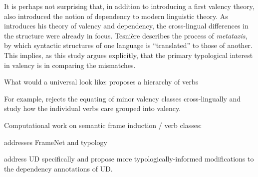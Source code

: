 It is perhaps not surprising that, in addition to introducing a first valency theory, \citet{tesniere1959} also introduced the notion of dependency to modern linguistic theory. 
As \citet{tesniere1959} introduces his theory of valency and dependency, the cross-lingual differences in the structure were already in focus. Tesnière describes the process of \textit{metataxis}, by which syntactic structures of one language is ``translated'' to those of another. This implies, as this study argues explicitly, that the primary typological interest in valency is in comparing the mismatches. 

What would a universal look like: \citet{tsunoda1981, tsunoda1985, tsunoda2015} proposes a hierarchy of verbs









For example, \citet{say2014} rejects the equating of minor valency classes cross-lingually and study how the individual verbs care grouped into valency.

Computational work on semantic frame induction / verb classes:  \citet{abend2009, basili1993, bickel2014, dowty1991, fellbaum1998, fillmore1968, furstenau2012, kipper-schuler2005, kipper2008, korhonen2006, levin2015, majewska2018, majewska2020, majewska2021, miller1990, miller1995, navarretta2000, palmer2005, say2014, sayeed2018, schulteimwalde2002, schulteimwalde2003, schulteimwalde2006, snider2006, sun2008, sun2009, sun2013, titov2012, watanabe2010, yamada2021} 

\citet{baker2020, ellsworth2021} addresses FrameNet and typology

\citet{croft2017} address UD specifically and propose more typologically-informed modifications to the dependency annotations of UD. 


